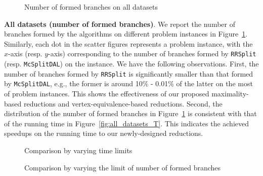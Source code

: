 \begin{figure}[]
        \vspace{-0.15in}
	\caption{Number of formed branches on all datasets}
	\label{fig:all_datasets_BT}
\end{figure}

\smallskip
\noindent\textbf{All datasets (number of formed branches)}. We report the number of branches formed by the algorithms on different problem instances in Figure~\ref{fig:all_datasets_BT}. Similarly, each dot in the scatter figures represents a problem instance, with the $x$-axis (resp. $y$-axis) corresponding to the number of branches formed by \texttt{RRSplit} (resp. \texttt{McSplitDAL}) {\chengC on the instance}. We have the following observations. First, the number of branches formed by \texttt{RRSplit} is significantly {\chengC smaller} than that formed by \texttt{McSplitDAL}, e.g., the former is around 10\% - 0.01\% of the latter on the most of problem instances. This shows the effectiveness of our proposed maximality-based reductions and vertex-equivalence-based reductions.
Second, the distribution of the number of formed branches in Figure~\ref{fig:all_datasets_BT} is consistent with that of the running time in Figure~\ref{fig:all_datasets_T}. This indicates the achieved speedups on the running time  to our newly-designed reductions.

\begin{figure}[]
        \vspace{-0.2in}
	\caption{Comparison by varying time limits}
	\label{fig:all_vary_T}
\end{figure}

\begin{figure}[]
        \vspace{-0.2in}
	\caption{Comparison by varying the limit of number of formed branches}
	\label{fig:all_vary_B}
\end{figure}

